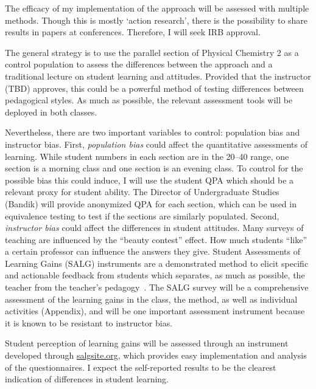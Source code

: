 \documentclass[10pt,letterpaper]{article}
\begin{document}

The efficacy of my implementation of the  \pogil approach will be assessed with multiple methods. Though this is mostly `action research', there is the possibility to share results in papers at \pogil conferences. Therefore,  I will seek IRB approval. 

The general strategy is to use the parallel section of Physical Chemistry 2 as a control population to assess the differences between the \pogil approach and a traditional lecture on student learning and attitudes. Provided that the instructor (TBD) approves, this could be a powerful method of testing differences between pedagogical styles. As much as possible, the relevant assessment tools will be deployed in both classes. 

Nevertheless, there are two important variables to control: population bias and instructor bias. First, \textit{population bias} could affect the quantitative assessments of learning. While student numbers in each section are in the 20--40 range, one section is a morning class and one section is an evening class. To control for the possible bias this could induce, I will use the student QPA which should be a relevant proxy for student ability. The Director of Undergraduate Studies (Bandik) will provide anonymized QPA for each section, which can be used in equivalence testing to test if the sections are similarly populated. Second, \textit{instructor bias} could affect the differences in student attitudes. Many surveys of teaching are influenced by the ``beauty contest'' effect. How much students ``like'' a certain professor can influence the answers they give. Student Assessments of Learning Gains (SALG) instruments are a demonstrated method to elicit specific and actionable feedback from students which separates, as much as possible, the teacher from the teacher's pedagogy~\cite{Seymour2000}. The SALG survey will be a comprehensive assessment of the learning gains in the class, the \pogil method, as well as individual activities (Appendix), and will be one important assessment instrument because it is known to be resistant to instructor bias.

\label{aim:pogil}


Student perception of learning gains will be assessed through an instrument developed through \url{salgsite.org}, which provides easy implementation and analysis of the questionnaires. I expect the self-reported results to be the clearest indication of differences in student learning. 
\end{document}
